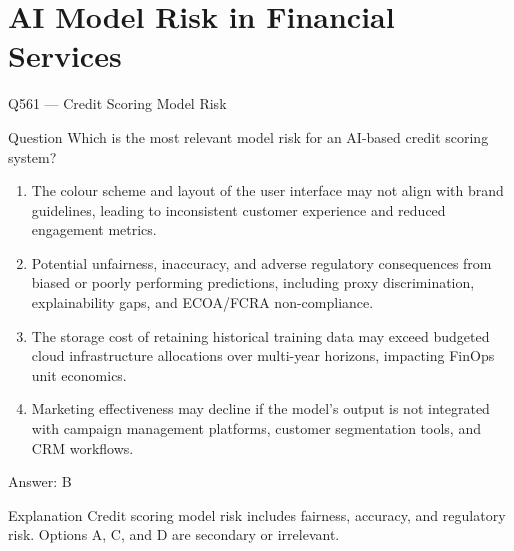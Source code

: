 \documentclass[aspectratio=169,8pt]{beamer}
\begin{document}
	\section{AI Model Risk in Financial Services}
	
	\begin{frame}{Q561 --- Credit Scoring Model Risk}
		\begin{block}{Question}
			Which is the most relevant model risk for an AI-based credit scoring system?
			\begin{enumerate}
				\item The colour scheme and layout of the user interface may not align with brand guidelines, leading to inconsistent customer experience and reduced engagement metrics.
				\item Potential unfairness, inaccuracy, and adverse regulatory consequences from biased or poorly performing predictions, including proxy discrimination, explainability gaps, and ECOA/FCRA non-compliance.
				\item The storage cost of retaining historical training data may exceed budgeted cloud infrastructure allocations over multi-year horizons, impacting FinOps unit economics.
				\item Marketing effectiveness may decline if the model's output is not integrated with campaign management platforms, customer segmentation tools, and CRM workflows.
			\end{enumerate}
		\end{block}
		\begin{exampleblock}{Answer: B}\end{exampleblock}
		\begin{block}{Explanation}
			Credit scoring model risk includes fairness, accuracy, and regulatory risk. Options A, C, and D are secondary or irrelevant.
		\end{block}
	\end{frame}
	
\end{document}
